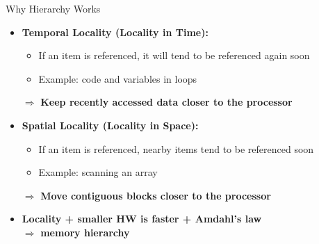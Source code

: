 \documentclass[aspectratio=169,12pt]{beamer}
\begin{document}
\begin{frame}{Why Hierarchy Works}
\begin{itemize}
  \item \textbf{Temporal Locality (Locality in Time):}
  \begin{itemize}
    \item If an item is referenced, it will tend to be referenced again soon
    \item Example: code and variables in loops
  \end{itemize}
  $\Rightarrow$ \textbf{Keep recently accessed data closer to the processor}
  
  \vspace{0.5cm}
  
  \item \textbf{Spatial Locality (Locality in Space):}
  \begin{itemize}
    \item If an item is referenced, nearby items tend to be referenced soon
    \item Example: scanning an array
  \end{itemize}
  $\Rightarrow$ \textbf{Move contiguous blocks closer to the processor}
  
  \vspace{0.5cm}
  
  \item \textbf{Locality + smaller HW is faster + Amdahl's law}\\
  $\Rightarrow$ \textbf{memory hierarchy}
\end{itemize}
\end{frame}
\end{document}
